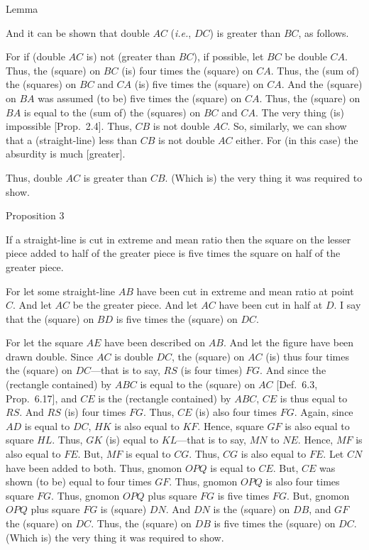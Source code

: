 \begin{center}
{\large Lemma}
\end{center}

And it can be shown that double $AC$ ({\em i.e.}, $DC$) is greater than $BC$, as follows.

For if  (double $AC$ is) not (greater than $BC$), if possible, let $BC$ be  double $CA$. Thus, the (square) on $BC$ (is) four times the (square)  on $CA$. Thus, the (sum of) the (squares)
on $BC$ and $CA$ (is) five times the (square)  on $CA$. And the
(square) on $BA$ was assumed (to be) five times the (square) on $CA$. 
Thus, the (square) on $BA$ is equal to the (sum of) the (squares) on $BC$
and $CA$. The very thing (is) impossible [Prop.~2.4]. Thus,
$CB$ is not  double $AC$. So, similarly, we can show that 
a (straight-line) less than $CB$ is not double $AC$ either. 
For (in this case) the absurdity is much [greater].

Thus, double $AC$ is greater than $CB$. (Which is) the very thing it
was required to show.


\begin{center}
{\large Proposition 3}
\end{center}

If a straight-line is cut in extreme and mean ratio then the square
on the lesser piece added to half of the greater piece is five
times the square on half of the greater piece.\\

\epsfysize=2.5in
\centerline{}

For let some straight-line $AB$ have been cut in extreme and mean ratio
at point $C$. And let $AC$ be the greater piece. And let $AC$ have been
cut in half at $D$. I say that the (square) on $BD$ is five times the
(square) on $DC$. 

For let the square $AE$ have been described on $AB$. And let the
figure have been drawn double. Since $AC$ is double $DC$, the
(square) on $AC$ (is) thus four times the (square) on $DC$---that
is to say, $RS$ (is four times) $FG$. And since the (rectangle contained)
by $ABC$ is equal to the (square) on $AC$ [Def.~6.3, Prop.~6.17],
and $CE$ is the (rectangle contained) by $ABC$,  $CE$ is thus equal
to $RS$. And $RS$ (is) four times $FG$. Thus, $CE$ (is) also four times
$FG$. Again, since $AD$ is equal to $DC$, $HK$ is also equal to
$KF$. Hence, square $GF$ is also equal to square $HL$. Thus,
$GK$ (is) equal to $KL$---that is to say, $MN$ to $NE$. 
Hence, $MF$ is also equal to $FE$. But, $MF$ is equal to $CG$.
Thus, $CG$ is also equal to $FE$. Let $CN$ have been added to both.
Thus, gnomon $OPQ$ is equal to $CE$. But, $CE$ was shown (to be)
equal to four times $GF$. Thus, gnomon $OPQ$  is also four times
square $FG$. Thus, gnomon $OPQ$ plus square $FG$ is five times
$FG$. But, gnomon $OPQ$ plus square $FG$ is (square) $DN$. 
And  $DN$ is the (square) on $DB$, and $GF$ the (square)
on $DC$. Thus, the (square) on $DB$ is five times the (square)
on $DC$. (Which is) the very thing it was required to show.

